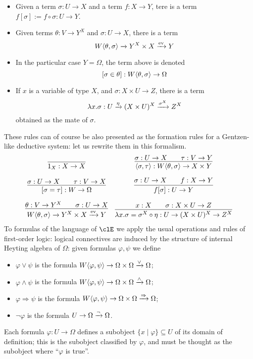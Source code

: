 \begin{definition}
\begin{itemize}
	\item Given a term $\sigma : U \to X$ and a term $f : X \to Y$, tere is a term $f[\sigma] := f\circ\sigma : U \to Y$.
	\item Given terms $\theta :  V \to Y^X$ and $\sigma : U\to X$, there is a term
	      \[
		      W\langle \theta,\sigma\rangle \xrightarrow{}Y^X\times X \xrightarrow{\text{ev}} Y
	      \]
	\item In the particular case $Y=\Omega$, the term above is denoted
	      \[[\sigma\in\theta] : W\langle \theta,\sigma\rangle \to \Omega\]
	\item If $x$ is a variable of type $X$, and $\sigma : X\times U \to Z$, there is a term
	      \[\lambda x.\sigma : U \xrightarrow{\eta} (X\times U)^X \xrightarrow{\sigma^X} Z^X\]
	      obtained as the mate of $\sigma$.
\end{itemize}
These rules can of course be also presented as the formation rules for a Gentzen-like deductive system: let us rewrite them in this formalism.
\[ \begin{array}{cc}
		\infer{1_X : X \to X}{}                                                              &
		\infer{\lr{\sigma}{\tau} : W\lr{\theta}{\sigma} \to X \times Y }{\sigma : U \to X    &   & \tau : V \to Y}             \\[1em]
		\infer{[\sigma=\tau] : W \to \Omega}{\sigma : U \to X                                &   & \tau : V \to X}           &
		\infer{f[\sigma] : U \to Y}{\sigma : U \to X                                         &   & f : X \to Y}                \\[1em]
		\infer{W\lr{\theta}{\sigma} \xto{}Y^X\times X \xto{\text{ev}} Y}{\theta :  V \to Y^X &   & \sigma : U\to X}          &
		\infer{\lambda x.\sigma = \sigma^X\circ\eta : U \to (X\times U)^X \to Z^X}{ x: X     &   & \sigma : X\times U \to Z}
	\end{array}\]
To formulas of the language of $\clE$ we apply the usual operations and rules of first-order logic: logical connectives are induced by the structure of internal Heyting algebra of $\Omega$: given formulas $\varphi,\psi$ we define
\begin{itemize}
	\item $\varphi\lor \psi$ is the formula $W\langle \varphi,\psi\rangle \to \Omega\times \Omega \xrightarrow{\lor} \Omega$;
	\item $\varphi\land\psi$ is the formula $W\langle \varphi,\psi\rangle \to \Omega\times \Omega \xrightarrow{\land} \Omega$;
	\item $\varphi\Rightarrow\psi$ is the formula $W\langle \varphi,\psi\rangle \to \Omega\times \Omega \xrightarrow{\Rightarrow} \Omega$;
	\item $\lnot\varphi$ is the formula $U \to \Omega \xrightarrow{\lnot} \Omega$.
\end{itemize}
\end{definition}
Each formula $\varphi : U \to \Omega$ defines a subobject $\{x\mid \varphi\} \subseteq U$ of its domain of definition; this is the subobject classified by $\varphi$, and must be thought as the subobject where ``$\varphi$ is true''.

